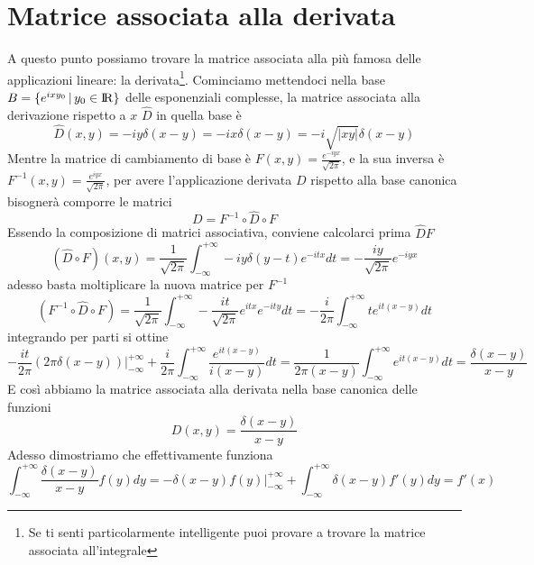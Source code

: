 \documentclass[11pt,a4paper]{report}
\theoremstyle{definition}
\theoremstyle{plain}
\theoremstyle{plain}
\begin{document}
		\section{Matrice associata alla derivata}
			A questo punto possiamo trovare la matrice associata alla più famosa delle applicazioni lineare: la derivata\footnote{Se ti senti particolarmente intelligente puoi provare a trovare la matrice associata all'integrale}.\newline
			Cominciamo mettendoci nella base $B=\{e^{ixy_0}\,|\,y_0 \in \rm I\!R \}$ delle esponenziali complesse, la matrice associata alla derivazione rispetto a $x$ $\widehat{D}$ in quella base è 
			\begin{equation}
				\widehat{D}(x,y)=-iy\delta (x-y)=-ix\delta(x-y)=-i\sqrt{|xy|}\delta(x-y)
			\end{equation}
			Mentre la matrice di cambiamento di base è $F(x,y)=\frac{e^{-iyx}}{\sqrt{2\pi}}$, e la sua inversa è $F^{-1}(x,y)=\frac{e^{iyx}}{\sqrt{2\pi}}$, per avere l'applicazione derivata $D$ rispetto alla base canonica bisognerà comporre le matrici
			\begin{equation}
				D=F^{-1}\circ \widehat{D}\circ F
			\end{equation}
			Essendo la composizione di matrici associativa, conviene calcolarci prima $\widehat{D}F$
			\[
				(\widehat{D}\circ F)(x,y)=\frac{1}{\sqrt{2\pi}}\int_{-\infty}^{+\infty}
				-iy\delta(y-t)e^{-itx}dt=-\frac{iy}{\sqrt{2\pi}}e^{-iyx}
			\]
			adesso basta moltiplicare la nuova matrice per $F^{-1}$
			\[
				(F^{-1}\circ \widehat{D}\circ F)=
				\frac{1}{\sqrt{2\pi}}\int_{-\infty}^{+\infty}-\frac{it}{\sqrt{2\pi}}e^{itx}e^{-ity}dt=
				-\frac{i}{2\pi}\int_{-\infty}^{+\infty}te^{it(x-y)}dt
			\]
			integrando per parti si ottine
			\[
				-\frac{it}{2\pi}(2\pi\delta(x-y))\bigg\rvert_{-\infty}^{+\infty}+
				\frac{i}{2\pi}\int_{-\infty}^{+\infty}\frac{e^{it(x-y)}}{i(x-y)}dt=
				\frac{1}{2\pi(x-y)}\int_{-\infty}^{+\infty}e^{it(x-y)}dt=\frac{\delta(x-y)}{x-y}
			\]
			E così abbiamo la matrice associata alla derivata nella base canonica delle funzioni
			\begin{equation}
				D(x,y)=\frac{\delta(x-y)}{x-y}
			\end{equation}
			Adesso dimostriamo che effettivamente funziona
			\[
				\int_{-\infty}^{+\infty}\frac{\delta(x-y)}{x-y}f(y)dy=-\delta(x-y)f(y)\big\rvert_{-\infty}^{+\infty}+\int_{-\infty}^{+\infty}\delta(x-y)f'(y)dy=f'(x)
			\]
\end{document}
